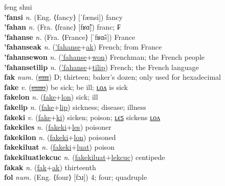 feng shui \label{'fancwey} \\
\textbf{'fansi} \textit{n.} (Eng. ⟨fancy⟩ [ˈfænsi])
fancy \label{'fansi} \\
\textbf{'fahan} \textit{n.} (Fra. ⟨franc⟩ [fʁɑ̃])
franc; ₣ \label{'fahan} \\
\textbf{'fahanse} \textit{n.} (Fra. ⟨France⟩ [ˈfʁɑ̃s])
France \label{'fahanse} \\
\textbf{'fahanseak} \textit{n.} (\hyperref['fahanse]{'fahanse}+\hyperref[ak]{ak})
French; from France \label{'fahanseak} \\
\textbf{'fahansewon} \textit{n.} (\hyperref['fahanse]{'fahanse}+\hyperref[won]{won})
Frenchman; the French people \label{'fahansewon} \\
\textbf{'fahansetilip} \textit{n.} (\hyperref['fahanse]{'fahanse}+\hyperref[tilip]{tilip})
French; the French language \label{'fahansetilip} \\
\textbf{fak} \textit{num.} (\hyperref[san]{\sout{san}})
D; thirteen; baker’s dozen; only used for hexadecimal \label{fak} \\
\textbf{fake} \textit{v.} (\hyperref[sano]{\sout{sano}})
be sick; be ill; \hyperref[fakelon]{ʟᴏᴧ} is sick \label{fake} \\
\textbf{fakelon} \textit{n.} (\hyperref[fake]{fake}+\hyperref[lon]{lon})
sick; ill \label{fakelon} \\
\textbf{fakelip} \textit{n.} (\hyperref[fake]{fake}+\hyperref[lip]{lip})
sickness; disease; illness \label{fakelip} \\
\textbf{fakeki} \textit{v.} (\hyperref[fake]{fake}+\hyperref[ki]{ki})
sicken; poison; \hyperref[fakekiles]{ʟєꜱ} sickens \hyperref[fakekilon]{ʟᴏᴧ} \label{fakeki} \\
\textbf{fakekiles} \textit{n.} (\hyperref[fakeki]{fakeki}+\hyperref[les]{les})
poisoner \label{fakekiles} \\
\textbf{fakekilon} \textit{n.} (\hyperref[fakeki]{fakeki}+\hyperref[lon]{lon})
poisoned \label{fakekilon} \\
\textbf{fakekiluat} \textit{n.} (\hyperref[fakeki]{fakeki}+\hyperref[luat]{luat})
poison \label{fakekiluat} \\
\textbf{fakekiluatlekcuc} \textit{n.} (\hyperref[fakekiluat]{fakekiluat}+\hyperref[lekcuc]{lekcuc})
centipede \label{fakekiluatlekcuc} \\
\textbf{fakak} \textit{n.} (\hyperref[fak]{fak}+\hyperref[ak]{ak})
thirteenth \label{fakak} \\
\textbf{fol} \textit{num.} (Eng. ⟨four⟩ [fɔɹ])
4; four; quadruple \label{fol} \\

